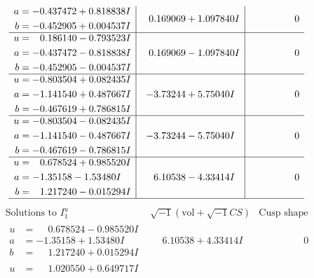 \documentclass[1p]{elsarticle_modified}
\theoremstyle{definition}
\newcommand{\I}{\sqrt{-1}}
\begin{document}
$$\begin{array}{c|c|c}
\begin{aligned}
a &= -0.437472 + 0.818838 I \\
b &= -0.452905 + 0.004537 I\end{aligned}
 & \phantom{-}0.169069 + 1.097840 I & \phantom{-0.000000 } 0 \\ \hline\begin{aligned}
u &= \phantom{-}0.186140 - 0.793523 I \\
a &= -0.437472 - 0.818838 I \\
b &= -0.452905 - 0.004537 I\end{aligned}
 & \phantom{-}0.169069 - 1.097840 I & \phantom{-0.000000 } 0 \\ \hline\begin{aligned}
u &= -0.803504 + 0.082435 I \\
a &= -1.141540 + 0.487667 I \\
b &= -0.467619 + 0.786815 I\end{aligned}
 & -3.73244 + 5.75040 I & \phantom{-0.000000 } 0 \\ \hline\begin{aligned}
u &= -0.803504 - 0.082435 I \\
a &= -1.141540 - 0.487667 I \\
b &= -0.467619 - 0.786815 I\end{aligned}
 & -3.73244 - 5.75040 I & \phantom{-0.000000 } 0 \\ \hline\begin{aligned}
u &= \phantom{-}0.678524 + 0.985520 I \\
a &= -1.35158 - 1.53480 I \\
b &= \phantom{-}1.217240 - 0.015294 I\end{aligned}
 & \phantom{-}6.10538 - 4.33414 I & \phantom{-0.000000 } 0\\
 \hline 
 \end{array}$$\newpage$$\begin{array}{c|c|c}  
\text{Solutions to }I^u_{1}& \I (\text{vol} + \sqrt{-1}CS) & \text{Cusp shape}\\
 \hline 
\begin{aligned}
u &= \phantom{-}0.678524 - 0.985520 I \\
a &= -1.35158 + 1.53480 I \\
b &= \phantom{-}1.217240 + 0.015294 I\end{aligned}
 & \phantom{-}6.10538 + 4.33414 I & \phantom{-0.000000 } 0 \\ \hline\begin{aligned}
u &= \phantom{-}1.020550 + 0.649717 I \\

\end{aligned}
\end{array}$$
\end{document}
